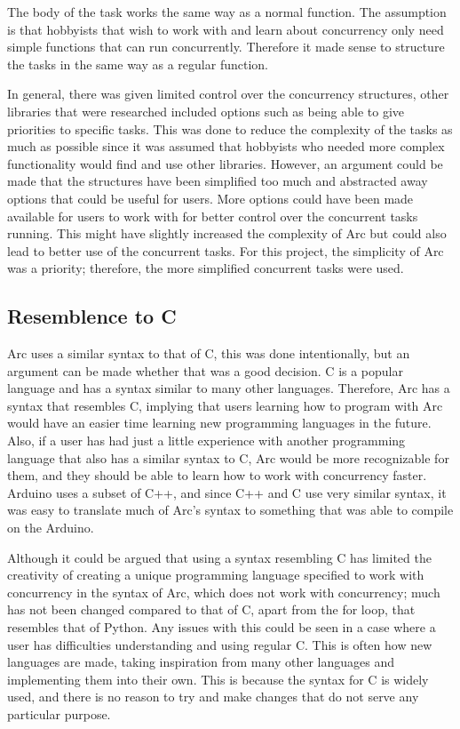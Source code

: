 The body of the task works the same way as a normal function. The assumption is that hobbyists that wish to work with and learn about concurrency only need simple functions that can run concurrently. Therefore it made sense to structure the tasks in the same way as a regular function.

In general, there was given limited control over the concurrency structures, other libraries that were researched included options such as being able to give priorities to specific tasks. This was done to reduce the complexity of the tasks as much as possible since it was assumed that hobbyists who needed more complex functionality would find and use other libraries. However, an argument could be made that the structures have been simplified too much and abstracted away options that could be useful for users. More options could have been made available for users to work with for better control over the concurrent tasks running. This might have slightly increased the complexity of Arc but could also lead to better use of the concurrent tasks. For this project, the simplicity of Arc was a priority; therefore, the more simplified concurrent tasks were used.


\subsection{Resemblence to C}
Arc uses a similar syntax to that of C, this was done intentionally, but an argument can be made whether that was a good decision. C is a popular language and has a syntax similar to many other languages. Therefore, Arc has a syntax that resembles C, implying that users learning how to program with Arc would have an easier time learning new programming languages in the future. Also, if a user has had just a little experience with another programming language that also has a similar syntax to C, Arc would be more recognizable for them, and they should be able to learn how to work with concurrency faster. Arduino uses a subset of C++, and since C++ and C use very similar syntax, it was easy to translate much of Arc's syntax to something that was able to compile on the Arduino.

Although it could be argued that using a syntax resembling C has limited the creativity of creating a unique programming language specified to work with concurrency in the syntax of Arc, which does not work with concurrency; much has not been changed compared to that of C, apart from the for loop, that resembles that of Python. Any issues with this could be seen in a case where a user has difficulties understanding and using regular C. This is often how new languages are made, taking inspiration from many other languages and implementing them into their own. This is because the syntax for C is widely used, and there is no reason to try and make changes that do not serve any particular purpose. 



